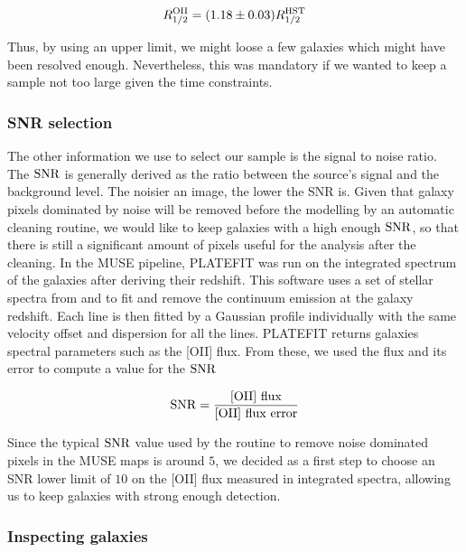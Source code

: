 \begin{equation}
	R_{1/2}^{\rm{OII}} = (1.18 \pm 0.03) R_{1/2}^{\rm{HST}}
\end{equation}

Thus, by using an upper limit, we might loose a few galaxies which might have been resolved enough. Nevertheless, this was mandatory if we wanted to keep a sample not too large given the time constraints.



\subsubsection{SNR selection}
\label{sec:cut_SNR}

The other information we use to select our sample is the signal to noise ratio. The $\rm{SNR}$ is generally derived as the ratio between the source's signal and the background level. The noisier an image, the lower the SNR is. Given that galaxy pixels dominated by noise will be removed before the modelling by an automatic cleaning routine, we would like to keep galaxies with a high enough $\rm{SNR}$, so that there is still a significant amount of pixels useful for the analysis after the cleaning. In the MUSE pipeline, \textsc{PLATEFIT}  was run on the integrated spectrum of the galaxies after deriving their redshift. This software uses a set of stellar spectra from  and  to fit and remove the continuum emission at the galaxy redshift. Each line is then fitted by a Gaussian profile individually with the same velocity offset and dispersion for all the lines. \textsc{PLATEFIT} returns galaxies spectral parameters such as the [OII] flux. From these, we used the flux and its error to compute a value for the $\rm{SNR}$

\begin{equation}
	\rm{SNR} = \frac{\rm{[OII] \,\, flux}}{\rm{[OII] \,\, flux \,\, error}}
\end{equation}

Since the typical $\rm{SNR}$ value used by the routine to remove noise dominated pixels in the MUSE maps is around $5$, we decided as a first step to choose an SNR lower limit of $10$ on the [OII] flux measured in integrated spectra, allowing us to keep galaxies with strong enough detection.



\subsubsection{Inspecting galaxies}
\label{sec:selecting_galaxies}

